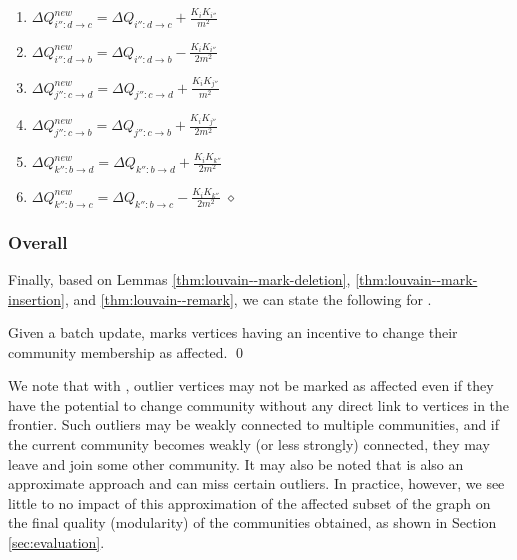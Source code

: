 \begin{enumerate}[start=23]
  \item $\Delta Q_{i'':d \rightarrow c}^{new} = \Delta Q_{i'':d \rightarrow c} + \frac{K_iK_{i''}}{m^2}$
  \item $\Delta Q_{i'':d \rightarrow b}^{new} = \Delta Q_{i'':d \rightarrow b} - \frac{K_iK_{i''}}{2m^2}$
  \item $\Delta Q_{j'':c \rightarrow d}^{new} = \Delta Q_{j'':c \rightarrow d} + \frac{K_iK_{j''}}{m^2}$
  \item $\Delta Q_{j'':c \rightarrow b}^{new} = \Delta Q_{j'':c \rightarrow b} + \frac{K_iK_{j''}}{2m^2}$
  \item $\Delta Q_{k'':b \rightarrow d}^{new} = \Delta Q_{k'':b \rightarrow d} + \frac{K_iK_{k''}}{2m^2}$
  \item $\Delta Q_{k'':b \rightarrow c}^{new} = \Delta Q_{k'':b \rightarrow c} - \frac{K_iK_{k''}}{2m^2}$ \hfill $\diamond$
\end{enumerate}




\subsubsection{Overall}

Finally, based on Lemmas \ref{thm:louvain--mark-deletion}, \ref{thm:louvain--mark-insertion}, and \ref{thm:louvain--remark}, we can state the following for \FroLou{}.

\begin{theorem}
\label{thm:louvain}
Given a batch update, \FroLou{} marks vertices having an incentive to change their community membership as affected. \qed
\end{theorem}

We note that with \FroLou{}, outlier vertices may not be marked as affected even if they have the potential to change community without any direct link to vertices in the frontier. Such outliers may be weakly connected to multiple communities, and if the current community becomes weakly (or less strongly) connected, they may leave and join some other community. It may also be noted that \DelLou{} is also an approximate approach and can miss certain outliers. In practice, however, we see little to no impact of this approximation of the affected subset of the graph on the final quality (modularity) of the communities obtained, as shown in Section \ref{sec:evaluation}.






